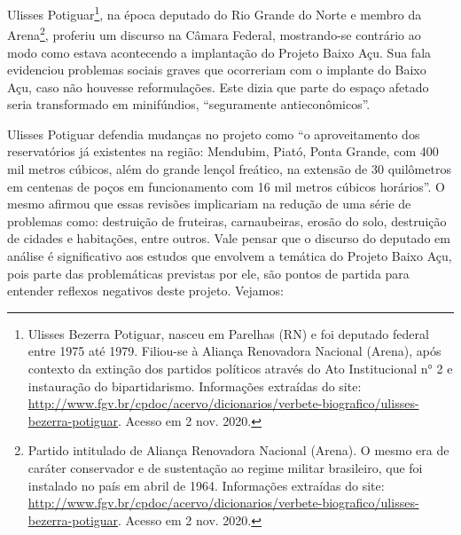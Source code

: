 \begin{refsection}
    Ulisses Potiguar\footnote{Ulisses Bezerra Potiguar, nasceu em Parelhas (RN) e foi deputado federal entre 1975 até 1979. Filiou-se à Aliança Renovadora Nacional (Arena), após contexto da extinção dos partidos políticos através do Ato Institucional n° 2 e instauração do bipartidarismo. Informações extraídas do site: \url{http://www.fgv.br/cpdoc/acervo/dicionarios/verbete-biografico/ulisses-bezerra-potiguar}. Acesso em 2 nov. 2020.}, na época deputado do Rio Grande do Norte e membro da Arena\footnote{Partido intitulado de Aliança Renovadora Nacional (Arena). O mesmo era de caráter conservador e de sustentação ao regime militar brasileiro, que foi instalado no país em abril de 1964. Informações extraídas do site: \url{http://www.fgv.br/cpdoc/acervo/dicionarios/verbete-biografico/ulisses-bezerra-potiguar}. Acesso em 2 nov. 2020.}, proferiu um discurso na Câmara Federal, mostrando-se contrário ao modo como estava acontecendo a implantação do Projeto Baixo Açu.  Sua fala evidenciou problemas sociais graves que ocorreriam com o implante do Baixo Açu, caso não houvesse reformulações. Este dizia que parte do espaço afetado seria transformado em minifúndios, ``seguramente antieconômicos''. 

    Ulisses Potiguar defendia mudanças no projeto como ``o aproveitamento dos reservatórios já existentes na região: Mendubim, Piató, Ponta Grande, com 400 mil metros cúbicos, além do grande lençol freático, na extensão de 30 quilômetros em centenas de poços em funcionamento com 16 mil metros cúbicos horários''. O mesmo afirmou que essas revisões implicariam na redução de uma série de problemas como: destruição de fruteiras, carnaubeiras, erosão do solo, destruição de cidades e habitações, entre outros.  Vale pensar que o discurso do deputado em análise é significativo aos estudos que envolvem a temática do Projeto Baixo Açu, pois parte das problemáticas previstas por ele, são pontos de partida para entender reflexos negativos deste projeto. Vejamos: 


\end{refsection}
